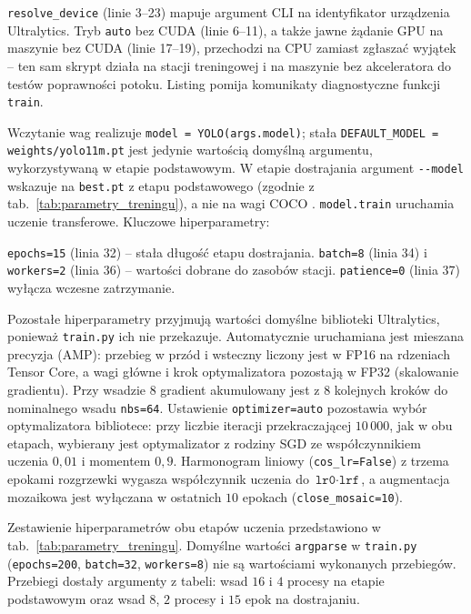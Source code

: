 \texttt{resolve\_device} (linie 3--23) mapuje argument CLI na identyfikator urządzenia Ultralytics. Tryb \texttt{auto} bez CUDA (linie 6--11), a także jawne żądanie GPU na maszynie bez CUDA (linie 17--19), przechodzi na CPU zamiast zgłaszać wyjątek – ten sam skrypt działa na stacji treningowej i na maszynie bez akceleratora do testów poprawności potoku. Listing pomija komunikaty diagnostyczne funkcji \texttt{train}.

Wczytanie wag realizuje \texttt{model = YOLO(args.model)}; stała \texttt{DEFAULT\_MODEL = weights/yolo11m.pt} jest jedynie wartością domyślną argumentu, wykorzystywaną w etapie podstawowym. W etapie dostrajania argument \texttt{-{}-model} wskazuje na \texttt{best.pt} z etapu podstawowego (zgodnie z tab.~\ref{tab:parametry_treningu}), a nie na wagi COCO \cite{lin2014coco}. \texttt{model.train} uruchamia uczenie transferowe. Kluczowe hiperparametry:

\texttt{epochs=15} (linia 32) -- stała długość etapu dostrajania. \texttt{batch=8} (linia 34) i \texttt{workers=2} (linia 36) -- wartości dobrane do zasobów stacji. \texttt{patience=0} (linia 37) wyłącza wczesne zatrzymanie.

Pozostałe hiperparametry przyjmują wartości domyślne biblioteki Ultralytics, ponieważ \texttt{train.py} ich nie przekazuje. Automatycznie uruchamiana jest mieszana precyzja (AMP): przebieg w przód i wsteczny liczony jest w FP16 na rdzeniach Tensor Core, a wagi główne i krok optymalizatora pozostają w FP32 (skalowanie gradientu). Przy wsadzie $8$ gradient akumulowany jest z $8$ kolejnych kroków do nominalnego wsadu \texttt{nbs=64}. Ustawienie \texttt{optimizer=auto} pozostawia wybór optymalizatora bibliotece: przy liczbie iteracji przekraczającej $10\,000$, jak w obu etapach, wybierany jest optymalizator z rodziny SGD ze współczynnikiem uczenia $0{,}01$ i momentem $0{,}9$. Harmonogram liniowy (\texttt{cos\_lr=False}) z trzema epokami rozgrzewki wygasza współczynnik uczenia do $\texttt{lr0}\cdot\texttt{lrf}$, a augmentacja mozaikowa jest wyłączana w ostatnich $10$ epokach (\texttt{close\_mosaic=10}).

Zestawienie hiperparametrów obu etapów uczenia przedstawiono w tab.~\ref{tab:parametry_treningu}. Domyślne wartości \texttt{argparse} w \texttt{train.py} (\texttt{epochs=200}, \texttt{batch=32}, \texttt{workers=8}) nie są wartościami wykonanych przebiegów. Przebiegi dostały argumenty z tabeli: wsad $16$ i $4$ procesy na etapie podstawowym oraz wsad $8$, $2$ procesy i $15$ epok na dostrajaniu.

